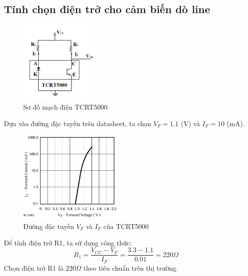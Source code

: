         \subsection{Tính chọn điện trở cho cảm biến dò line}
            \begin{figure}[H]
                \centering
                \includegraphics[width=0.35\textwidth]{pictures/chapter4/c4_p2_TCRT5000Schematic.png}
                \caption{Sơ đồ mạch điện TCRT5000}
                \label{fig:4-4}
            \end{figure}
            \hspace*{0.6cm}Dựa vào đường đặc tuyến trên datasheet, ta chọn $V_{F} = 1.1$ (V) và $I_{F} = 10$ (mA).\\
            \begin{figure}[H]
                \centering
                \includegraphics[width=0.5\textwidth]{pictures/chapter4/c4_p3_Voltage&Current.png}
                \caption{Đường đặc tuyến $V_{F}$ và $I_{F}$ của TCRT5000}
                \label{fig:4-5}
            \end{figure}
            Để tính điện trở R1, ta sử dụng công thức:
            \begin{equation}
                R_{1} = \frac{V_{CC} - V_{F}}{I_{F}} = \frac{3.3 - 1.1}{0.01} = 220 \Omega
                \label{eq:4-1}
            \end{equation}
            \hspace*{0.6cm}Chọn điện trở R1 là $220 \Omega$ theo tiêu chuẩn trên thị trường.\\[0.4cm]
